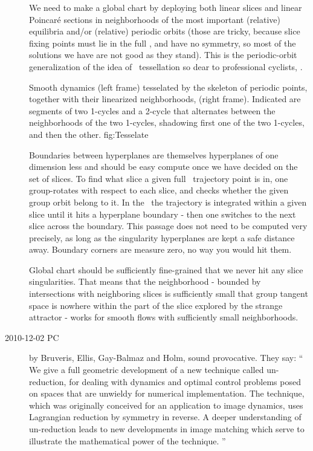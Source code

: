 \begin{description}
We need to make a global chart by deploying both linear slices and linear
Poincar\'e sections in neighborhoods of the most important (relative)
equilibria and/or (relative) periodic orbits (those are tricky, because
slice fixing points must lie in the full \statesp, and have no symmetry,
so most of the solutions we have are not good as they stand). This is the
periodic-orbit generalization of the idea of
{\statesp\ tessellation}
so dear to professional cyclists, .

{}{
Smooth dynamics  (left frame) tesselated by the skeleton of
periodic points, together with their linearized neighborhoods,
(right frame).
Indicated are segments of two 1-cycles and a 2-cycle that
alternates between the neighborhoods of the two 1-cycles,
shadowing first one of the two 1-cycles, and then the other.
}{fig:Tesselate} %
%
%


Boundaries
between hyperplanes are themselves hyperplanes of one dimension less and
should be easy compute once we have decided on the set of slices. To find
what slice a given full \statesp\ trajectory point is in, one group-rotates
with respect to each slice, and checks whether the given group orbit
belong to it. In the \reducedsp\ the trajectory is integrated within a
given slice until it hits a hyperplane boundary - then one switches to
the next slice across the boundary. This passage does not need to
be computed very precisely, as long as the singularity
hyperplanes are kept a safe distance away. Boundary corners are measure zero, no
way you would hit them.

Global chart should be sufficiently fine-grained that we never hit any
slice singularities. That means that the neighborhood - bounded by
intersections with neighboring slices is sufficiently small that group
tangent space is nowhere within the part of the slice explored by
the strange attractor - works for smooth flows
with sufficiently small neighborhoods.

\item[2010-12-02 PC]
by Bruveris, Ellis, Gay-Balmaz and Holm,
sound provocative. They say: ``
We give a full geometric development of a new technique called
un-reduction, for dealing with dynamics and optimal control problems posed on
spaces that are unwieldy for numerical implementation. The technique, which was
originally conceived for an application to image dynamics, uses Lagrangian
reduction by symmetry in reverse. A deeper understanding of un-reduction leads
to new developments in image matching which serve to illustrate the
mathematical power of the technique.
''


\end{description}
